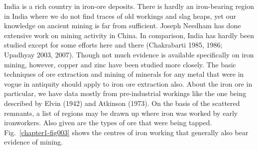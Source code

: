 India is a rich country in iron-ore deposits. There is hardly an iron-bearing region in India where we do not find traces of old workings and slag heaps, yet our knowledge on ancient mining is far from sufficient. Joseph Needham has done extensive work on mining activity in China. In comparison, India has hardly been studied except for some efforts here and there (Chakrabarti 1985, 1986; Upadhyay 2003, 2007). Though not much evidence is available specifically on iron mining, however, copper and zinc have been studied more closely. The basic techniques of ore extraction and mining of minerals for any metal that were in vogue in antiquity should apply to iron ore extraction also. About the iron ore in particular, we have data mostly from pre-industrial workings like the one being described by Elvin (1942) and Atkinson (1973). On the basis of the scattered remnants, a list of regions may be drawn up where iron was worked by early ironworkers. Also given are the types of ore that were being tapped. Fig.~\ref{chapter1-fig003} shows the centres of iron working that generally also bear evidence of mining.

